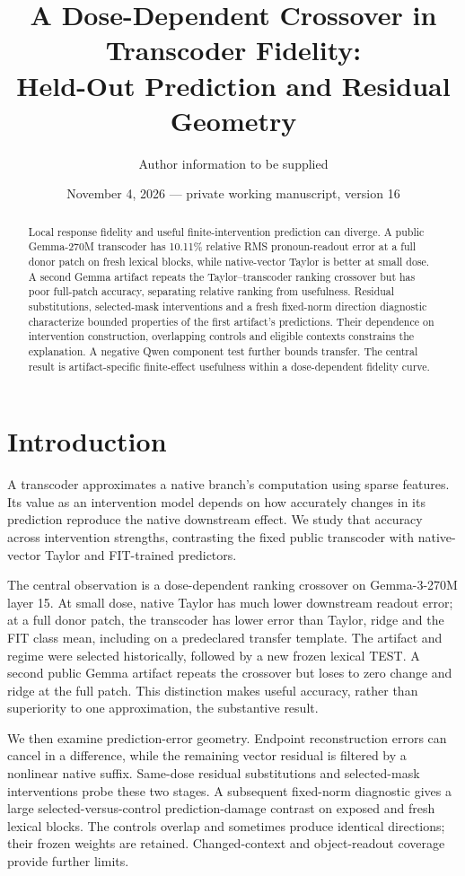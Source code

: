 \documentclass[11pt]{article}
\title{A Dose-Dependent Crossover in Transcoder Fidelity:\\Held-Out Prediction and Residual Geometry}
\author{Author information to be supplied}
\date{November 4, 2026 --- private working manuscript, version 16}
\begin{document}
\maketitle
\begin{abstract}
Local response fidelity and useful finite-intervention prediction can diverge. A public Gemma-270M transcoder has 10.11\% relative RMS pronoun-readout error at a full donor patch on fresh lexical blocks, while native-vector Taylor is better at small dose. A second Gemma artifact repeats the Taylor--transcoder ranking crossover but has poor full-patch accuracy, separating relative ranking from usefulness. Residual substitutions, selected-mask interventions and a fresh fixed-norm direction diagnostic characterize bounded properties of the first artifact's predictions. Their dependence on intervention construction, overlapping controls and eligible contexts constrains the explanation. A negative Qwen component test further bounds transfer. The central result is artifact-specific finite-effect usefulness within a dose-dependent fidelity curve.
\end{abstract}

\section{Introduction}
A transcoder approximates a native branch's computation using sparse features. Its value as an intervention model depends on how accurately changes in its prediction reproduce the native downstream effect. We study that accuracy across intervention strengths, contrasting the fixed public transcoder with native-vector Taylor and FIT-trained predictors.

The central observation is a dose-dependent ranking crossover on Gemma-3-270M layer 15. At small dose, native Taylor has much lower downstream readout error; at a full donor patch, the transcoder has lower error than Taylor, ridge and the FIT class mean, including on a predeclared transfer template. The artifact and regime were selected historically, followed by a new frozen lexical TEST. A second public Gemma artifact repeats the crossover but loses to zero change and ridge at the full patch. This distinction makes useful accuracy, rather than superiority to one approximation, the substantive result.

We then examine prediction-error geometry. Endpoint reconstruction errors can cancel in a difference, while the remaining vector residual is filtered by a nonlinear native suffix. Same-dose residual substitutions and selected-mask interventions probe these two stages. A subsequent fixed-norm diagnostic gives a large selected-versus-control prediction-damage contrast on exposed and fresh lexical blocks. The controls overlap and sometimes produce identical directions; their frozen weights are retained. Changed-context and object-readout coverage provide further limits.
\end{document}

